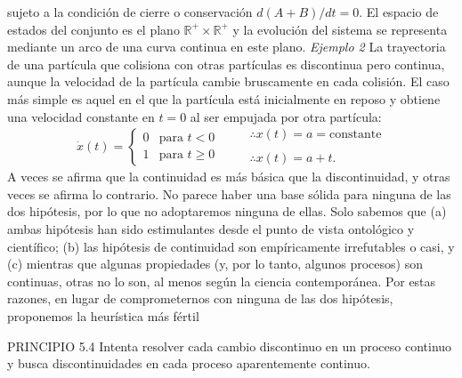 \begin{justifying}
    \noindent sujeto a la condición de cierre o conservación $d(A+B)/dt=0$. El espacio de estados del conjunto es el plano $\mathbb{R}^+ \times \mathbb{R}^+$ y la evolución del sistema se representa mediante un arco de una curva continua en este plano. \textit{Ejemplo 2} La trayectoria de una partícula que colisiona con otras partículas es 
    discontinua pero continua, aunque la velocidad de la partícula cambie bruscamente en cada colisión. El caso más simple es aquel en el que la partícula está inicialmente en reposo y obtiene una velocidad constante en $t=0$ al ser empujada por otra partícula:
    \[
        \dot{x}(t) = 
        \begin{cases} 
        0 & \text{para } t < 0 \\
        1 & \text{para } t \ge 0 
        \end{cases}
        \qquad
        \begin{array}{l}
        \therefore x(t) = a = \text{constante} \\
        \\
        \therefore x(t) = a + t.
        \end{array}
    \]
    A veces se afirma que la continuidad es más básica que la discontinuidad, y otras veces se afirma lo contrario. No parece haber una base sólida para ninguna de las dos hipótesis, por lo que no adoptaremos ninguna de ellas. Solo sabemos que (a) ambas hipótesis han sido estimulantes desde el punto de vista ontológico y científico; (b) las hipótesis de continuidad son empíricamente irrefutables o casi, y (c) mientras que algunas propiedades (y, por lo tanto, algunos procesos) son continuas, otras no lo son, al menos según la ciencia contemporánea. Por estas razones, en lugar de comprometernos con ninguna de las dos hipótesis, proponemos la heurística más fértil

    \medskip
    \noindent PRINCIPIO 5.4 Intenta resolver cada cambio discontinuo en un proceso continuo y busca discontinuidades en cada proceso aparentemente continuo.
\end{justifying}